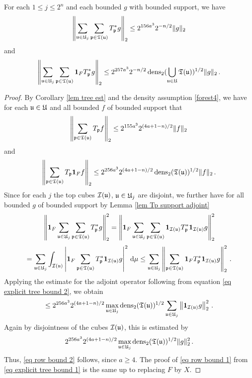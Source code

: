 {\begin{lemma}
    \label{lem row bound}
    For each $1 \le j \le 2^n$ and each bounded $g$ with bounded support, we have
    \begin{equation}
        \label{eq row bound 1}
        \left\| \sum_{\mathfrak u \in \mathfrak U_j} \sum_{\mathfrak p \in \mathfrak T(\mathfrak u)}  T_{\mathfrak p}^* g\right\|_2 \le 2^{156a^3} 2^{-n/2} \|g\|_2
    \end{equation}
    and
    \begin{equation}
        \label{eq row bound 2}
        \left\| \sum_{\mathfrak u \in \mathfrak U_j} \sum_{\mathfrak p \in \mathfrak T(\mathfrak u)} \mathbf{1}_F T_{\mathfrak p}^* g\right\|_2 \le 2^{257a^3} 2^{-n/2} \operatorname{\operatorname{dens}}_2(\bigcup_{\mathfrak u\in \mathfrak U}\mathfrak T(\mathfrak u))^{1/2}  \|g\|_2\,.
    \end{equation}
\end{lemma}

\begin{proof}
    By Corollary \ref{lem tree est} and the density assumption \eqref{forest4}, we have for each $\mathfrak u \in \mathfrak U$ and all bounded $f$ of bounded support that
    \begin{equation}
        \label{eq explicit tree bound 1}
        \left\|\sum_{\mathfrak p \in \mathfrak T(\mathfrak u)} T_{\mathfrak p} f \right\|_{2}  \le 2^{155a^3} 2^{(4a+1-n)/2}  \|f\|_2\,
    \end{equation}
    and
    \begin{equation}
        \label{eq explicit tree bound 2}
        \left\|\sum_{\mathfrak p \in \mathfrak T(\mathfrak u)} T_{\mathfrak p} \mathbf{1}_F f \right\|_{2} \le 2^{256a^3} 2^{(4a + 1-n)/2} \operatorname{\operatorname{dens}}_2(\mathfrak T(\mathfrak u))^{1/2} \|f\|_2\,.
    \end{equation}
    Since for each $j$ the top cubes $\mathcal{I}(\mathfrak u)$, $\mathfrak u \in \mathfrak U_j$ are disjoint, we further have for all bounded $g$ of bounded support by Lemma \ref{lem Tp support adjoint}
    $$
        \left\|\mathbf{1}_F \sum_{\mathfrak u \in \mathfrak U_j} \sum_{\mathfrak p \in \mathfrak T(\mathfrak u)} T_{\mathfrak p}^* g\right\|_2^2 = \left\|\mathbf{1}_F \sum_{\mathfrak u \in \mathfrak U_j} \sum_{\mathfrak p \in \mathfrak T(\mathfrak u)} \mathbf{1}_{\mathcal{I}(\mathfrak u)} T_{\mathfrak p}^* \mathbf{1}_{\mathcal{I}(\mathfrak u)} g\right\|_2^2
    $$
    $$
        = \sum_{\mathfrak u \in \mathfrak U_j} \int_{\mathcal{I}(\mathfrak u)} \left| \mathbf{1}_F \sum_{\mathfrak p \in \mathfrak T(\mathfrak u)} T_{\mathfrak p}^* \mathbf{1}_{\mathcal{I}(\mathfrak u)} g\right|^2 \, \mathrm{d}\mu
        \le \sum_{\mathfrak u \in \mathfrak U_j} \left\|\sum_{\mathfrak p \in \mathfrak T(\mathfrak u)} \mathbf{1}_F T_{\mathfrak p}^* \mathbf{1}_{\mathcal{I}(\mathfrak u)} g\right\|_2^2\,.
    $$
    Applying the estimate for the adjoint operator following from equation \eqref{eq explicit tree bound 2}, we obtain
    $$
        \le 2^{256a^3} 2^{(4a+1-n)/2} \max_{\mathfrak u \in \mathfrak U_j}\operatorname{\operatorname{dens}}_2(\mathfrak T(\mathfrak u))^{1/2} \sum_{\mathfrak u \in \mathfrak U_j} \left\| \mathbf{1}_{\mathcal{I}(\mathfrak u)} g\right\|_2^2\,.
    $$
    Again by disjointness of the cubes $\mathcal{I}(\mathfrak u)$, this is estimated by
    $$
        2^{256a^3} 2^{(4a+1-n)/2} \max_{\mathfrak u \in \mathfrak U_j}\operatorname{\operatorname{dens}}_2(\mathfrak T(\mathfrak u))^{1/2} \|g\|_2^2\,.
    $$
    Thus, \eqref{eq row bound 2} follows, since $a \ge 4$.
    The proof of \eqref{eq row bound 1} from \eqref{eq explicit tree bound 1} is the same up to replacing $F$ by $X$.
\end{proof}

}
